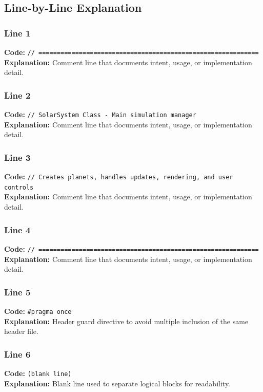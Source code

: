 \documentclass[11pt,a4paper]{article}
\begin{document}
\subsection{Line-by-Line Explanation}
\subsubsection*{Line 1}
\textbf{Code:} \verb|// ============================================================|\\
\textbf{Explanation:} Comment line that documents intent, usage, or implementation detail.

\subsubsection*{Line 2}
\textbf{Code:} \verb|// SolarSystem Class - Main simulation manager|\\
\textbf{Explanation:} Comment line that documents intent, usage, or implementation detail.

\subsubsection*{Line 3}
\textbf{Code:} \verb|// Creates planets, handles updates, rendering, and user controls|\\
\textbf{Explanation:} Comment line that documents intent, usage, or implementation detail.

\subsubsection*{Line 4}
\textbf{Code:} \verb|// ============================================================|\\
\textbf{Explanation:} Comment line that documents intent, usage, or implementation detail.

\subsubsection*{Line 5}
\textbf{Code:} \verb|#pragma once|\\
\textbf{Explanation:} Header guard directive to avoid multiple inclusion of the same header file.

\subsubsection*{Line 6}
\textbf{Code:} \texttt{(blank line)}\\
\textbf{Explanation:} Blank line used to separate logical blocks for readability.
\end{document}
